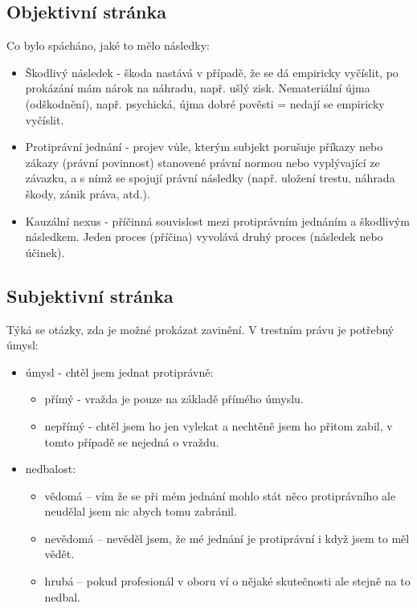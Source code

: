 \subsection*{Objektivní stránka}
Co bylo spácháno, jaké to mělo následky:
\begin{itemize}
    \item Škodlivý následek - škoda nastává v případě, že se dá empiricky vyčíslit, po prokázání mám nárok na náhradu, např. ušlý zisk. Nemateriální újma (odškodnění), např. psychická, újma dobré pověsti = nedají se empiricky vyčíslit.
    \item Protiprávní jednání - projev vůle, kterým subjekt porušuje příkazy nebo zákazy (právní povinnost) stanovené právní normou nebo vyplývající ze závazku, a s nímž se spojují právní následky (např. uložení trestu, náhrada škody, zánik práva, atd.).
    \item Kauzální nexus - příčinná souvislost mezi protiprávním jednáním a škodlivým následkem. Jeden proces (příčina) vyvolává druhý proces (následek nebo účinek).
\end{itemize}

\subsection*{Subjektivní stránka}
Týká se otázky, zda je možné prokázat zavinění. V trestním právu je potřebný úmysl:
\begin{itemize}
        \item úmysl - chtěl jsem jednat protiprávně:
        \begin{itemize}
             \item přímý - vražda je pouze na základě přímého úmyslu.
            \item nepřímý - chtěl jsem ho jen vylekat a nechtěně jsem ho přitom zabil, v tomto případě se nejedná o vraždu.
        \end{itemize}
        \item nedbalost:
        \begin{itemize}
            \item vědomá -- vím že se při mém jednání mohlo stát něco protiprávního ale neudělal jsem nic abych tomu zabránil.
            \item nevědomá -- nevěděl jsem, že mé jednání je protiprávní i když jsem to měl vědět.
            \item hrubá -- pokud profesionál v oboru ví o nějaké skutečnosti ale stejně na to nedbal.
        \end{itemize}
    \end{itemize}

